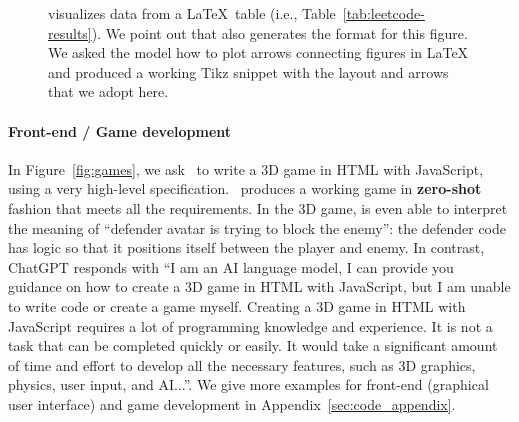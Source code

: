 \begin{figure}[H]
\begin{AIbox}{\DV}
\end{AIbox}
\caption{\DV visualizes data from a \LaTeX\ table (i.e., Table~\ref{tab:leetcode-results}). We point out that \DV also generates the format for this figure. We asked the model how to plot arrows connecting figures in \LaTeX\, and \DV produced a working Tikz snippet with the layout and arrows that we adopt here.}
\label{fig:pyplot}
\end{figure}






\paragraph{Front-end / Game development}
In Figure~\ref{fig:games}, we ask \DV\ to write a 3D game in HTML with JavaScript, using a very high-level specification. \DV\ produces a working game in \textbf{zero-shot} fashion that meets all the requirements. In the 3D game, \DV{} is even able to interpret the meaning of ``defender avatar is trying to block the enemy'': the defender code has logic so that it positions itself between the player and enemy. In contrast, ChatGPT responds with ``I am an AI language model, I can provide you guidance on how to create a 3D game in HTML with JavaScript, but I am unable to write code or create a game myself.
Creating a 3D game in HTML with JavaScript requires a lot of programming knowledge and experience. It is not a task that can be completed quickly or easily. It would take a significant amount of time and effort to develop all the necessary features, such as 3D graphics, physics, user input, and AI...''. We give more examples for front-end (graphical user interface) and game development in Appendix~\ref{sec:code_appendix}. 



